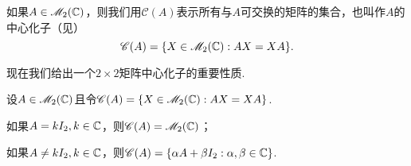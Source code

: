   如果$A\in\mathscr M_2(\mathbb C)$，则我们用$\mathscr C(A)$表示所有与$A$可交换的矩阵的集合，也叫作$A$的{\kaishu 中心化子}（见\cite[p.213]{38}）
  \[
    \mathscr C(A) = \{ X\in\mathscr M_2(\mathbb C):AX=XA \}.
  \]

  现在我们给出一个$2\times2$矩阵中心化子的重要性质.
  \begin{mybox}
    \begin{theorem}[矩阵$A$的中心化子.]

      设$A\in\mathscr M_2(\mathbb C)$且令$\mathscr C (A)=\{X\in\mathscr M_2(\mathbb C):AX=XA\}$.
      \begin{enum}
        \item 如果$A=kI_2,k\in\mathbb C$，则$\mathscr C (A)=\mathscr M_2(\mathbb C)$；
        \item\label{thm1.1itemb} 如果$A\ne kI_2,k\in\mathbb C$，则$\mathscr C(A)=\{\alpha A+\beta I_2:\alpha,\beta\in\mathbb C\}$.
      \end{enum}
    \end{theorem}
  \end{mybox}
